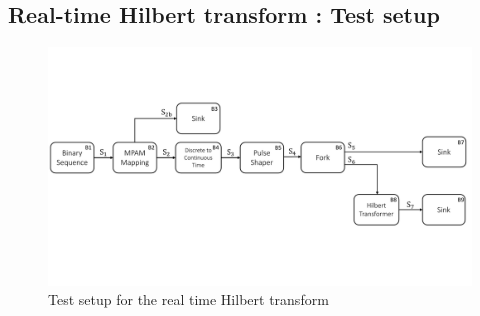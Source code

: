 \begin{refsection}
\subsection*{Real-time Hilbert transform : Test setup}
\begin{figure}[h]
	\centering
	\includegraphics[width=14cm]{./algorithms/hilbert/figures/test_setup.pdf}
	\caption{Test setup for the real time Hilbert transform }\label{test_setup}
\end{figure}

\end{refsection}
